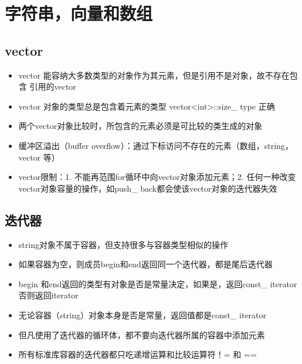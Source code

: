 \documentclass[11pt]{article}
\begin{document}
\section{字符串，向量和数组}
\label{sec-1}
\subsection{vector}
\label{sec-1-1}
\begin{itemize}
\item vector 能容纳大多数类型的对象作为其元素，但是引用不是对象，故不存在包含
引用的vector
\item vector 对象的类型总是包含着元素的类型 vector<int>::size\_ type 正确
\item 两个vector对象比较时，所包含的元素必须是可比较的类生成的对象
\item 缓冲区溢出（buffer overflow）：通过下标访问不存在的元素（数组，string，vector 等）
\item vector限制：1. 不能再范围for循环中向vector对象添加元素；2. 任何一种改变
vector对象容量的操作，如push\_ back都会使该vector对象的迭代器失效
\end{itemize}

\subsection{迭代器}
\label{sec-1-2}
\begin{itemize}
\item string对象不属于容器，但支持很多与容器类型相似的操作
\item 如果容器为空，则成员begin和end返回同一个迭代器，都是尾后迭代器
\item begin 和end返回的类型有对象是否是常量决定，如果是，返回const\_ iterator
否则返回iterator
\item 无论容器（string）对象本身是否是常量，返回值都是const\_ iterator
\item 但凡使用了迭代器的循环体，都不要向迭代器所属的容器中添加元素
\item 所有标准库容器的迭代器都只吃递增运算和比较运算符！= 和 ==
\end{itemize}
\end{document}
